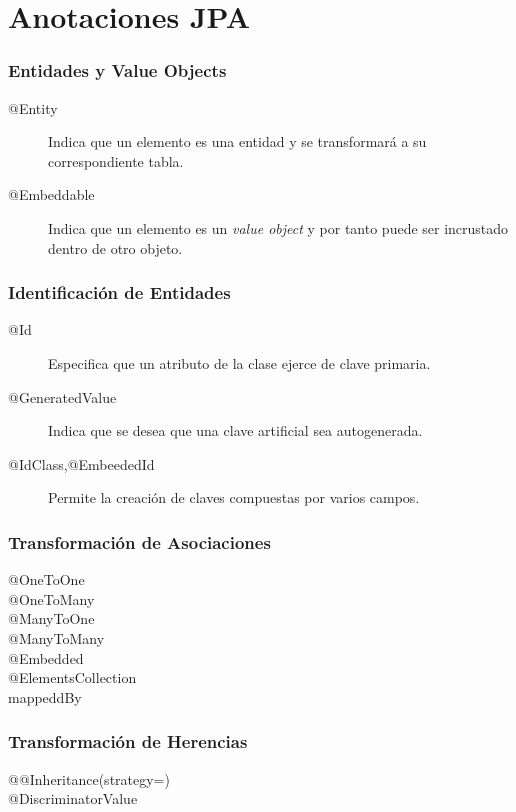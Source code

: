 \documentclass[a4paper,slidestop,xcolor=pst,blue]{beamer}
\begin{document}
\section{Anotaciones JPA}

\begin{frame}[c]
    \frametitle{Entidades y Value Objects}
    \begin{description}
        \item[@Entity] Indica que un elemento es una entidad y se transformará a su correspondiente tabla.
        \item[@Embeddable] Indica que un elemento es un \emph{value object} y por tanto puede ser incrustado dentro de otro objeto.
    \end{description}
\end{frame}

\begin{frame}[c]
    \frametitle{Identificación de Entidades}
    \begin{description}
        \item[@Id] Especifica que un atributo de la clase ejerce de clave primaria.
        \item[@GeneratedValue] Indica que se desea que una clave artificial sea autogenerada.
        \item[@IdClass,@EmbeededId] Permite la creación de claves compuestas por varios campos.
    \end{description}
\end{frame}

\begin{frame}[c]
    \frametitle{Transformación de Asociaciones}
    \begin{description}
        \item[@OneToOne]
        \item[@OneToMany]
        \item[@ManyToOne]
        \item[@ManyToMany]
        \item[@Embedded]
        \item[@ElementsCollection]
        \item[mappeddBy]
    \end{description}
\end{frame}

\begin{frame}[c]
    \frametitle{Transformación de Herencias}
    \begin{description}
        \item[@@Inheritance(strategy=)]
        \item[@DiscriminatorValue]
    \end{description}
\end{frame}
\end{document}
